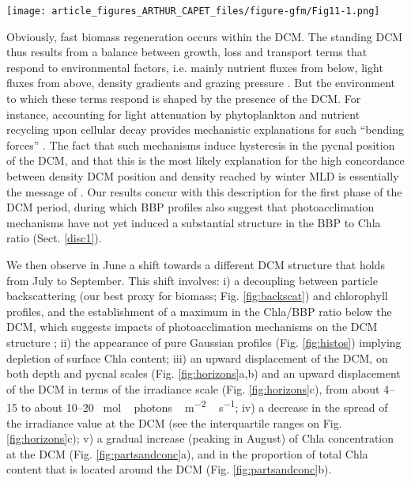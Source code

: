 \documentclass[journal abbreviation, manuscript]{copernicus}
\begin{document}
\begin{figure*}[h!] 
    \texttt{[image: article\_figures\_ARTHUR\_CAPET\_files/figure-gfm/Fig11-1.png]}
    \caption{Ratio between the $\sigma_{DCM}$ of individual profiles and the maximum $\sigma_{MLD}$ recorded by the same float during the same year. West and East longitude are defined with respect to the  meridian of 34.5\textdegree E}
    \label{fig:discfig}
\end{figure*}

Obviously, fast biomass regeneration occurs within the DCM.
The standing DCM thus results from a balance between growth, loss and transport terms that respond to environmental factors, i.e. mainly nutrient fluxes from below, light fluxes from above, density gradients and grazing pressure \citep{Cullen2015}. 
But the environment to which these terms respond is shaped by the presence of the DCM.
For instance, accounting for light attenuation by phytoplankton and nutrient recycling upon cellular decay provides mechanistic explanations for such “bending forces” \citep[e.g.][]{Klausmeier2001, Beckmann2007}.
The fact that such mechanisms induce hysteresis in the pycnal position of the DCM, and that this is the most likely explanation for the high concordance between density DCM position and density reached by winter MLD is essentially the message of \citet{Navarro2013}. 
Our results concur with this description for the first phase of the DCM period, during which BBP profiles also suggest that photoacclimation mechanisms have not yet induced a substantial structure in the BBP to Chla ratio (Sect. \ref{disc1}).

We then observe in June a shift towards a different DCM structure that holds from July to September. This shift involves: 
i) a decoupling between particle backscattering (our best proxy for biomass; Fig. \ref{fig:backscat}) and chlorophyll profiles, and the establishment of a maximum in the Chla/BBP ratio below the DCM, which suggests impacts of photoacclimation mechanisms on the DCM structure \citep{Fennel2003};
ii) the appearance of pure Gaussian profiles (Fig. \ref{fig:histos}) implying depletion of surface Chla content;
iii) an upward displacement of the DCM, on both depth and pycnal scales (Fig. \ref{fig:horizons}a,b) and an upward displacement of the DCM in terms of the irradiance scale (Fig. \ref{fig:horizons}c), from about 4--15 to about 10--20 \unit{\mu mol\, photons \,m^{-2}\,s^{-1}}; 
iv) a decrease in the spread of the irradiance value at the DCM (see the interquartile ranges on Fig. \ref{fig:horizons}c);
v) a gradual increase (peaking in August) of Chla concentration at the DCM (Fig. \ref{fig:partsandconc}a), and in the proportion of total Chla content that is located around the DCM (Fig. \ref{fig:partsandconc}b).
\end{document}
